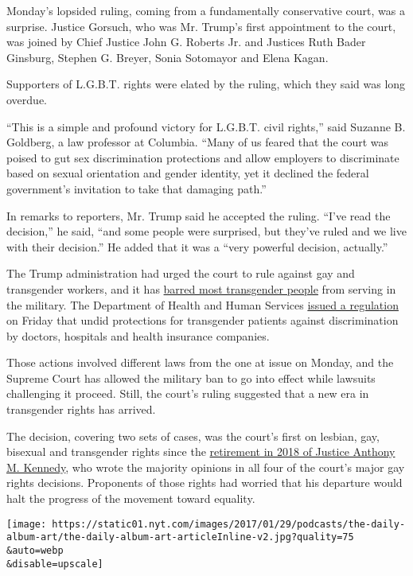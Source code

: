 Monday's lopsided ruling, coming from a fundamentally conservative
court, was a surprise. Justice Gorsuch, who was Mr. Trump's first
appointment to the court, was joined by Chief Justice John G. Roberts
Jr. and Justices Ruth Bader Ginsburg, Stephen G. Breyer, Sonia Sotomayor
and Elena Kagan.

Supporters of L.G.B.T. rights were elated by the ruling, which they said
was long overdue.

``This is a simple and profound victory for L.G.B.T. civil rights,''
said Suzanne B. Goldberg, a law professor at Columbia. ``Many of us
feared that the court was poised to gut sex discrimination protections
and allow employers to discriminate based on sexual orientation and
gender identity, yet it declined the federal government's invitation to
take that damaging path.''

In remarks to reporters, Mr. Trump said he accepted the ruling. ``I've
read the decision,'' he said, ``and some people were surprised, but
they've ruled and we live with their decision.'' He added that it was a
``very powerful decision, actually.''

The Trump administration had urged the court to rule against gay and
transgender workers, and it has
\href{https://www.nytimes.com/2019/01/22/us/politics/transgender-ban-military-supreme-court.html}{barred
most transgender people} from serving in the military. The Department of
Health and Human Services
\href{https://www.nytimes.com/2020/06/12/us/politics/trump-transgender-rights.html}{issued
a regulation} on Friday that undid protections for transgender patients
against discrimination by doctors, hospitals and health insurance
companies.

Those actions involved different laws from the one at issue on Monday,
and the Supreme Court has allowed the military ban to go into effect
while lawsuits challenging it proceed. Still, the court's ruling
suggested that a new era in transgender rights has arrived.

The decision, covering two sets of cases, was the court's first on
lesbian, gay, bisexual and transgender rights since the
\href{https://www.nytimes.com/2018/06/27/us/politics/anthony-kennedy-retire-supreme-court.html?module=inline}{retirement
in 2018 of Justice Anthony M. Kennedy}, who wrote the majority opinions
in all four of the court's major gay rights decisions. Proponents of
those rights had worried that his departure would halt the progress of
the movement toward equality.

\texttt{[image: https://static01.nyt.com/images/2017/01/29/podcasts/the-daily-album-art/the-daily-album-art-articleInline-v2.jpg?quality=75\\\&auto=webp\\\&disable=upscale]}

